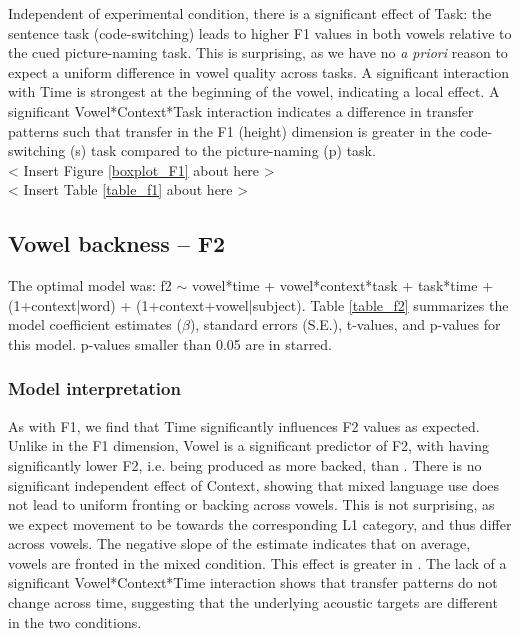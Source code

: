 \documentclass[12 pt]{article}
\newcommand{\nt}[1]{\textipa{[#1]}} %
\begin{document}
Independent of experimental condition, there is a significant effect of Task: the sentence task (code-switching) leads to higher F1 values in both vowels relative to the cued picture-naming task. This is surprising, as we have no \textit{a priori} reason to expect a uniform difference in vowel quality across tasks. A significant interaction with Time is strongest at the beginning of the vowel, indicating a local effect. A significant Vowel*Context*Task interaction indicates a difference in transfer patterns such that transfer in the F1 (height) dimension is greater in the code-switching (s) task compared to the picture-naming (p) task.\\


< Insert Figure \ref{boxplot_F1} about here >\\

< Insert Table \ref{table_f1} about here >

\subsection{Vowel backness -- F2}
The optimal model was: f2 $\sim$ vowel*time + vowel*context*task + task*time + (1+context|word) + (1+context+vowel|subject). Table \ref{table_f2} summarizes the model coefficient estimates ($\beta$), standard errors (S.E.), t-values, and p-values for this model. p-values smaller than 0.05 are in starred.



\subsubsection*{Model interpretation}

As with F1, we find that Time significantly influences F2 values as expected. Unlike in the F1 dimension, Vowel is a significant predictor of F2, with \nt{2} having significantly lower F2, i.e. being produced as more backed, than \nt{\ae}. There is no significant independent effect of Context, showing that mixed language use does not lead to uniform fronting or backing across vowels. This is not surprising, as we expect movement to be towards the corresponding L1 category, and thus differ across vowels. The negative slope of the estimate indicates that on average, vowels are fronted in the mixed condition. This effect is greater in \nt{\ae}. The lack of a significant Vowel*Context*Time interaction shows that transfer patterns do not change across time, suggesting that the underlying acoustic targets are different in the two conditions.
 
\end{document}
